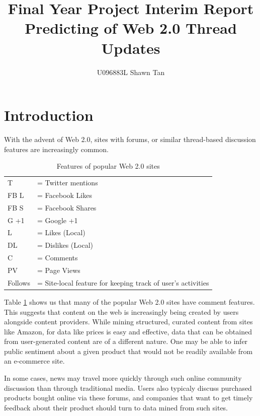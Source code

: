 \documentclass[12 pt]{article}
\title{Final Year Project Interim Report\\ Predicting of Web 2.0 Thread Updates}
\author{U096883L Shawn Tan}
\date{}
\begin{document}
\doublespacing
\maketitle
\section{Introduction}
With the advent of Web 2.0, sites with forums, or similar thread-based discussion features are increasingly common.

\begin{table}\label{table:web20}
	{\footnotesize
\caption{Features of popular Web 2.0 sites}
	\begin{tabular}{l l}
		T &= Twitter mentions\\
	 FB L &= Facebook Likes \\
		FB S &= Facebook Shares\\
	G +1 &= Google +1\\
		   L&= Likes (Local) \\
   		DL &= Dislikes (Local) \\
			C &= Comments \\
		PV &= Page Views \\
   Follows &= Site-local feature for keeping track of user's activities
	\end{tabular}
}

\end{table}

Table \ref{table:web20} shows us that many of the popular Web 2.0 sites have comment features. This suggests that content on the web is increasingly being created by users alongside content providers. While mining structured, curated content from sites like Amazon, for data like prices is easy and effective, data that can be obtained from user-generated content are of a different nature. One may be able to infer public sentiment about a given product that would not be readily available from an e-commerce site.

In some cases, news may travel more quickly through such online community discussion than through traditional media.
Users also typicaly discuss purchased products bought online via these forums, and companies that want to get timely
feedback about their product should turn to data mined from such sites.
\end{document}
